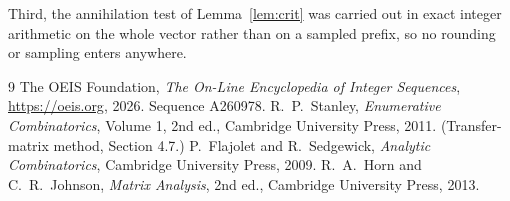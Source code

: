 \documentclass[11pt,a4paper]{article}
\theoremstyle{plain}
\theoremstyle{definition}
\begin{document}
Third, the annihilation test of Lemma~\ref{lem:crit} was carried out in exact integer
arithmetic on the whole vector rather than on a sampled prefix, so no rounding or sampling
enters anywhere.

\begin{thebibliography}{9}
 The OEIS Foundation, \emph{The On-Line Encyclopedia of Integer
Sequences}, \url{https://oeis.org}, 2026. Sequence A260978.
 R.~P.~Stanley, \emph{Enumerative Combinatorics}, Volume 1, 2nd ed.,
Cambridge University Press, 2011. (Transfer-matrix method, Section 4.7.)
 P.~Flajolet and R.~Sedgewick, \emph{Analytic Combinatorics}, Cambridge
University Press, 2009.
 R.~A.~Horn and C.~R.~Johnson, \emph{Matrix Analysis}, 2nd ed., Cambridge
University Press, 2013.
\end{thebibliography}
\end{document}
